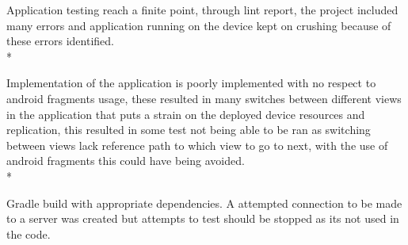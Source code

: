 
%
%

Application testing reach a finite point, through lint report, the project included many errors and application running on the device kept on crushing because of these errors identified.
\\*

Implementation of the application is poorly implemented with no respect to android fragments usage, these resulted in many switches between different views in the application that puts a strain on the deployed device resources and replication, this resulted in some test not being able to be ran as switching between views lack reference path to which view to go to next, with the use of android fragments this could have being avoided.
\\*

Gradle build with appropriate dependencies. A attempted connection to be made to a server was created but attempts to test should be stopped as its not used in the code.

